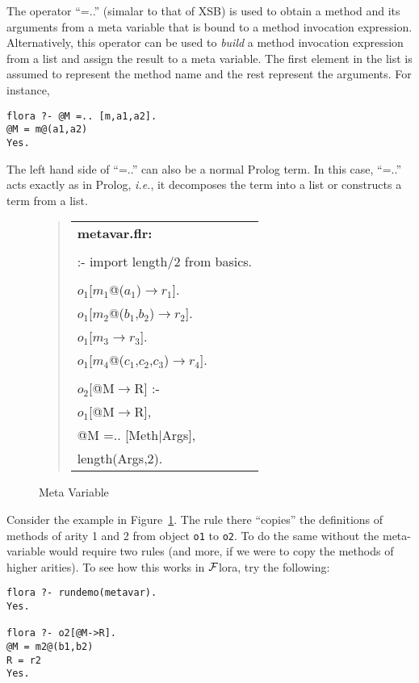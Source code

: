 \documentclass[11pt]{article}
\newcommand{\fd}{\ensuremath{{\rightarrow}}}                   %
\newcommand{\FLORA}{{\mbox{${\cal F}${\sc lora}}}\xspace}
\begin{document}
The operator ``=..'' (simalar to that of XSB) is used to obtain a method and
its arguments from a meta variable that is bound to a method invocation
expression. Alternatively, this operator can be used to \emph{build} a
method invocation expression from a list and assign the result to a meta
variable. The first element in the list is assumed to represent the method
name and the rest represent the arguments.  For instance,
\begin{verbatim}
flora ?- @M =.. [m,a1,a2].
@M = m@(a1,a2)
Yes.
\end{verbatim}
\noindent
The left hand side of ``=..'' can also be a normal Prolog term. In this
case,
``=..'' acts exactly as in Prolog, {\it i.e.}, it decomposes the term into
a list or constructs a term from a list.
\begin{figure}[tb]
\begin{quote}
\begin{tabular}{l}
{\bf metavar.flr:}\\ \\
:- import length/2 from basics. \\ \\
$o_1$[$m_1$@($a_1$){\fd}$r_1$]. \\
$o_1$[$m_2$@($b_1$,$b_2$){\fd}$r_2$]. \\
$o_1$[$m_3${\fd}$r_3$]. \\
$o_1$[$m_4$@($c_1$,$c_2$,$c_3$){\fd}$r_4$]. \\ \\
$o_2$[@M{\fd}R] :- \\
\hspace{1.5cm}	$o_1$[@M{\fd}R], \\
\hspace{1.5cm}	@M =.. [Meth$|$Args], \\
\hspace{1.5cm}	length(Args,2).
\end{tabular}
\end{quote}
\caption{Meta Variable} \label{fig:fig-metavar}
\end{figure}

Consider the example in Figure~\ref{fig:fig-metavar}.  The rule there
``copies'' the definitions of methods of arity 1 and 2 from object {\tt o1}
to {\tt o2}. To do the same without the meta-variable would require two
rules (and more, if we were to copy the methods of higher arities).  To see
how this works in \FLORA, try the following:
\begin{verbatim}
flora ?- rundemo(metavar).
Yes.

flora ?- o2[@M->R].
@M = m2@(b1,b2)
R = r2
Yes.
\end{verbatim}
\end{document}
